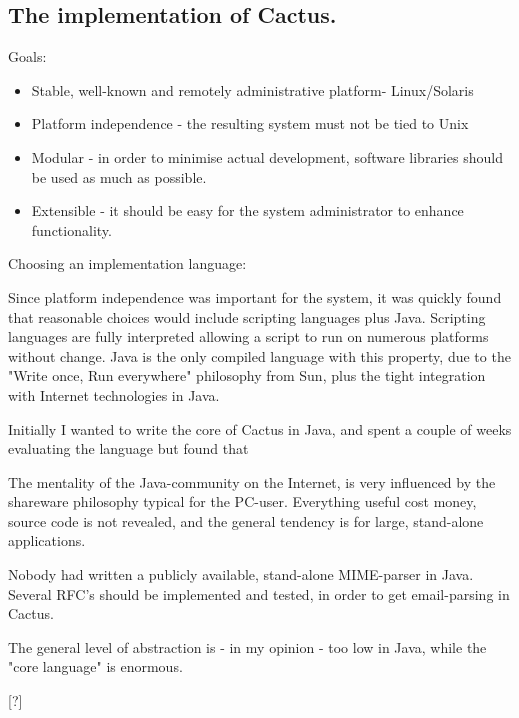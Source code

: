 \subsection{The implementation of Cactus.}



Goals:

\begin{itemize}
\item Stable, well-known and remotely administrative platform-
  Linux/Solaris
\item Platform independence - the resulting system must not be tied to
  Unix
 
\item Modular - in order to minimise actual development, software
  libraries should be used as much as possible.
  
\item Extensible - it should be easy for the system administrator to
  enhance functionality.
\end{itemize}

Choosing an implementation language:
\label{sec:cactus-choice-of-language}

Since platform independence was important for the system, it was
quickly found that reasonable choices would include scripting
languages plus Java.  Scripting languages are fully interpreted
allowing a script to run on numerous platforms without change.  Java
is the only compiled language with this property, due to the "Write
once, Run everywhere" philosophy from Sun, plus the tight integration
with Internet technologies in Java.

Initially I wanted to write the core of Cactus in Java, and spent a
couple of weeks evaluating the language but found that


  The mentality of the Java-community on the Internet, is very influenced by the shareware philosophy typical for the PC-user.   Everything useful cost money, source
code is not revealed, and the general tendency is for large, stand-alone applications.

Nobody had written a publicly available, stand-alone MIME-parser in Java.  Several RFC's should be implemented and tested, in order to get email-parsing in Cactus.

The general level of abstraction is - in my opinion - too low in Java, while the "core language" is enormous.



[?]



